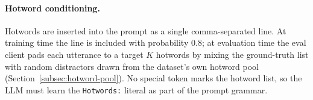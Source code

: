 \paragraph{Hotword conditioning.}
Hotwords are inserted into the prompt as a single comma-separated line.
At training time the line is included with probability $0.8$; at
evaluation time the eval client pads each utterance to a target $K$
hotwords by mixing the ground-truth list with random distractors drawn
from the dataset's own hotword pool (Section~\ref{subsec:hotword-pool}).
No special token marks the hotword list, so the LLM must learn the
\verb|Hotwords:| literal as part of the prompt grammar.

\FloatBarrier
